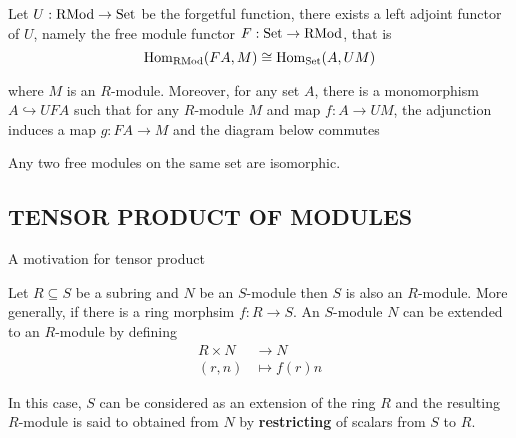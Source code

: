 \begin{theorem}
	Let $U: \operatorname{RMod} \to \operatorname{Set}$ be the forgetful function, there exists a left adjoint functor of $U$, namely the free module functor $F: \operatorname{Set} \to \operatorname{RMod}$, that is
	$$
		\operatorname{Hom}_{\operatorname{RMod}} (FA, M) \cong \operatorname{Hom}_{\operatorname{Set}} (A, UM)
	$$
	
	where $M$ is an $R$-module. Moreover, for any set $A$, there is a monomorphism $A \hookrightarrow UFA$ such that for any $R$-module $M$ and map $f: A \to UM$, the adjunction induces a map $g: FA \to M$ and the diagram below commutes
	
	\begin{center}
	\end{center}
\end{theorem}

\begin{corollary}
	Any two free modules on the same set are isomorphic. 
\end{corollary}

\subsection{TENSOR PRODUCT OF MODULES}

A motivation for tensor product

Let $R \subseteq S$ be a subring and $N$ be an $S$-module then $S$ is also an $R$-module. More generally, if there is a ring morphsim $f: R \to S$. An $S$-module $N$ can be extended to an $R$-module by defining 
\begin{align*}
	R \times N &\to N \\
	(r, n) &\mapsto f(r) n
\end{align*}

In this case, $S$ can be considered as an extension of the ring $R$ and the resulting $R$-module is said to obtained from $N$ by \textbf{restricting} of scalars from $S$ to $R$. 


